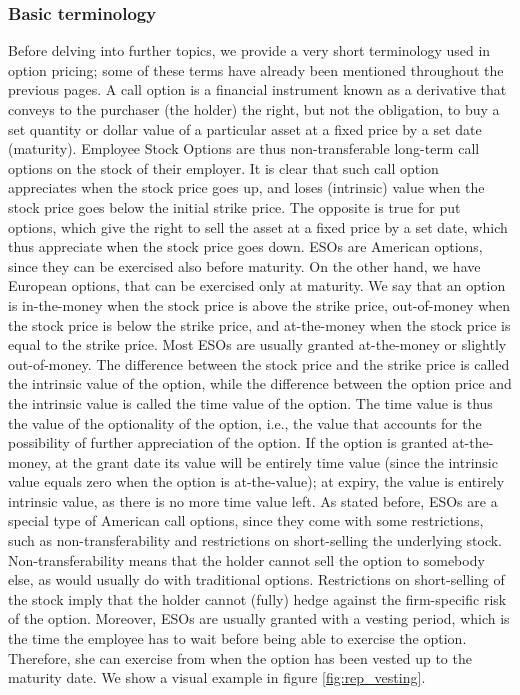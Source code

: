 \subsubsection{Basic terminology}
    Before delving into further topics, we provide a very short terminology used in option pricing; some of these terms have already been mentioned throughout the previous pages.
    A call option is a financial instrument known as a derivative that conveys to the purchaser (the holder) the right, but not the obligation, to buy a set quantity or dollar value of a particular asset at a fixed price by a set date (maturity). Employee Stock Options are thus non-transferable long-term call options on the stock of their employer. It is clear that such call option appreciates when the stock price goes up, and loses (intrinsic) value when the stock price goes below the initial strike price. The opposite is true for put options, which give the right to sell the asset at a fixed price by a set date, which thus appreciate when the stock price goes down.
    ESOs are American options, since they can be exercised also before maturity. On the other hand, we have European options, that can be exercised only at maturity. We say that an option is in-the-money when the stock price is above the strike price, out-of-money when the stock price is below the strike price, and at-the-money when the stock price is equal to the strike price. Most ESOs are usually granted at-the-money or slightly out-of-money. 
    The difference between the stock price and the strike price is called the intrinsic value of the option, while the difference between the option price and the intrinsic value is called the time value of the option. The time value is thus the value of the optionality of the option, i.e., the value that accounts for the possibility of further appreciation of the option. If the option is granted at-the-money, at the grant date its value will be entirely time value (since the intrinsic value equals zero when the option is at-the-value); at expiry, the value is entirely intrinsic value, as there is no more time value left.
    As stated before, ESOs are a special type of American call options, since they come with some restrictions, such as non-transferability and restrictions on short-selling the underlying stock. Non-transferability means that the holder cannot sell the option to somebody else, as would usually do with traditional options. Restrictions on short-selling of the stock imply that the holder cannot (fully) hedge against the firm-specific risk of the option. Moreover, ESOs are usually granted with a vesting period, which is the time the employee has to wait before being able to exercise the option. Therefore, she can exercise from when the option has been vested up to the maturity date. We show a visual example in figure \ref{fig:rep_vesting}. 

